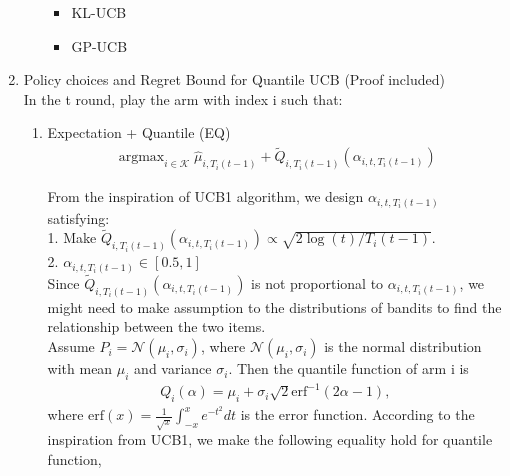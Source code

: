 \documentclass{article}
\DeclareMathOperator*{\argmax}{argmax}
\begin{document}
\begin{enumerate}
\begin{enumerate}
\begin{itemize}
\begin{enumerate}
            \end{enumerate}
        \item KL-UCB
        \item GP-UCB
    \end{itemize}
\end{enumerate}

\item Policy choices and Regret Bound for Quantile UCB (Proof included)\\
In the t round, play the arm with index i such that:
    \begin{enumerate}
    \item Expectation + Quantile (EQ)
    \begin{align}
    \argmax_{i \in \mathcal{K}} \hat{\mu}_{i,T_i(t-1)} + \tilde{Q}_{i,T_i(t-1)}(\alpha_{i, t, T_i(t-1)})
    \end{align}
   
    \iffalse
    But how to define $\alpha$?\\
    1. $\alpha_{t, T_j(t)} = \sqrt{\log(t)/T_j(t)}$. Not constrained between 0 and 1.\\
    2. $\alpha_{t, T_j(t)} = sigmoid (\sqrt{\log(t)/T_j(t)}) \in [0.5, 1)$. But $\alpha_{t, T_j(t)}$ is not proportional to $\sqrt{\log(t)/T_j(t)}$ anymore.\\
    \fi
    
    From the inspiration of UCB1 algorithm, we design $\alpha_{i, t, T_i(t-1)}$ satisfying:\\
    1. Make $\tilde{Q}_{i,T_i(t-1)}(\alpha_{i, t, T_i(t-1)}) \varpropto \sqrt{2\log(t)/T_i(t-1)}$.\\
    2. $\alpha_{i, t, T_i(t-1)} \in [0.5, 1]$\\
    Since $\tilde{Q}_{i,T_i(t-1)}(\alpha_{i, t, T_i(t-1)})$ is not proportional to $\alpha_{i, t, T_i(t-1)}$, we might need to make assumption to the distributions of bandits to find the relationship between the two items. \\
    
    Assume $P_i = \mathcal{N}(\mu_i, \sigma_i)$, where $\mathcal{N}(\mu_i, \sigma_i)$ is the normal distribution with mean $\mu_i$ and variance $\sigma_i$. Then the quantile function of arm i is
    \begin{align}
        Q_i(\alpha) = \mu_i + \sigma_i \sqrt{2} \text{erf}^{-1} (2\alpha - 1),
    \end{align}
    where $\text{erf}(x) = \frac{1}{\sqrt{x}} \int_{-x}^{x} e^{-t^2}dt$ is the error function.
    According to the inspiration from UCB1, we make the following equality hold for quantile function,
    

\end{enumerate}
\end{enumerate}
\end{document}
